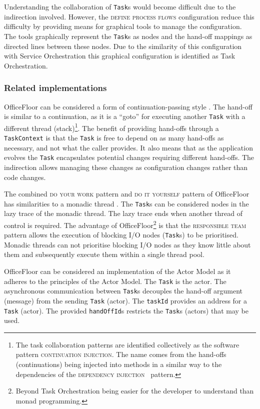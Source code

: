 \documentclass[prodmode]{style/acmlarge}
\begin{document}
Understanding the collaboration of \texttt{Task}s would become difficult due to
the indirection involved.  However, the \textsc{define process flows}
configuration reduce this difficulty by providing means for graphical tools to
manage the configuration.  The tools graphically represent the \texttt{Task}s as
nodes and the hand-off mappings as directed lines between these nodes.  Due to
the similarity of this configuration with Service Orchestration this graphical
configuration is identified as Task Orchestration.



\subsubsection*{Related implementations}

OfficeFloor can be considered a form of continuation-passing style
\cite{continuations}.  The hand-off is similar to a continuation, as it is a
``goto'' for executing another \texttt{Task} with a different thread
(stack)\footnote{The task collaboration patterns are identified collectively as
the software pattern \textsc{continuation injection}.  The name comes from the
hand-offs (continuations) being injected into methods in a similar way to the
dependencies of the \textsc{dependency injection}~\cite{ioc} pattern.}.  The
benefit of providing hand-offs through a \texttt{TaskContext} is that the
\texttt{Task} is free to depend on as many hand-offs as necessary, and not what
the caller provides.  It also means that as the application evolves the
\texttt{Task} encapsulates potential changes requiring different hand-offs.  The
indirection allows managing these changes as configuration changes rather than
code changes.

The combined \textsc{do your work} pattern and \textsc{do it yourself} pattern
of OfficeFloor has similarities to a monadic thread \cite{monadic-thread}.  The
\texttt{Task}s can be considered nodes in the lazy trace of the monadic thread. 
The lazy trace ends when another thread of control is required.  The advantage of
OfficeFloor\footnote{Beyond Task Orchestration being easier for the developer to
understand than monad programming.} is that the \textsc{responsible team}
pattern allows the execution of blocking I/O nodes (\texttt{Task}s) to be
prioritised.  Monadic threads can not prioritise blocking I/O nodes as they know
little about them and subsequently execute them within a single thread pool.

OfficeFloor can be considered an implementation of the Actor Model \cite{actors}
as it adheres to the principles of the Actor Model.  The \texttt{Task} is the
actor.  The asynchronous communication between \texttt{Task}s decouples the
hand-off argument (message) from the sending \texttt{Task} (actor).  The
\texttt{taskId} provides an address for a \texttt{Task} (actor).  The provided
\texttt{handOffId}s restricts the \texttt{Task}s (actors) that may be used.
\end{document}
